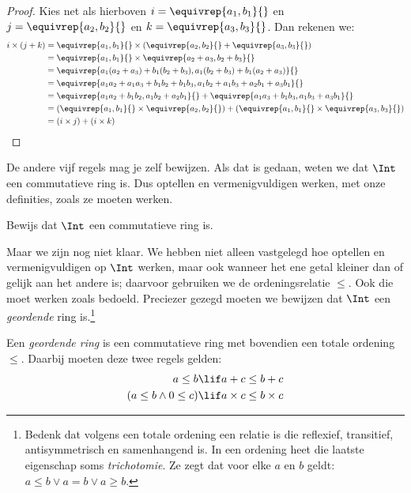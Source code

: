 \documentclass[openany]{memoir}
\begin{document}
\begin{proof}
Kies net als hierboven $i = \equivrep{a_1, b_1}{}$ en $j =
\equivrep{a_2,b_2}{}$ en $k = \equivrep{a_3, b_3}{}$. Dan rekenen we:
\begin{align*}
	i \times (j + k) 
	&= \equivrep{a_1, b_1}{} \times (\equivrep{a_2,b_2}{} + \equivrep{a_3, b_3}{})\\
	&= \equivrep{a_1, b_1}{} \times \equivrep{a_2 + a_3,b_2+b_3}{}\\
	&= \equivrep{a_1  (a_2 + a_3) + b_1  (b_2+b_3), a_1  (b_2 + b_3) + b_1 (a_2 + a_3)}{}\\
	&= \equivrep{a_1 a_2 + a_1a_3 + b_1 b_2+b_1b_3, a_1 b_2 + a_1b_3 + a_2b_1 + a_3b_1}{}\\		
	&= \equivrep{a_1a_2 + b_1b_2, a_1b_2 + a_2b_1}{} + \equivrep{a_1a_3 + b_1b_3, a_1b_3 + a_3b_1}{}\\
	&= (\equivrep{a_1, b_1}{} \times \equivrep{a_2,b_2}{}) + (\equivrep{a_1, b_1}{} \times  \equivrep{a_3, b_3}{})\\
	&= (i \times j) + (i \times k)
\end{align*}
\end{proof}
De andere vijf regels mag je zelf bewijzen. Als dat is gedaan, weten
we dat $\Int$ een commutatieve ring is. Dus optellen en
vermenigvuldigen werken, met onze definities, zoals ze moeten werken.
\begin{prob}
Bewijs dat $\Int$ een commutatieve ring is.
\end{prob}
Maar we zijn nog niet klaar. We hebben niet alleen vastgelegd hoe
optellen en vermenigvuldigen op $\Int$ werken, maar ook wanneer het
ene getal kleiner dan of gelijk aan het andere is; daarvoor gebruiken
we de ordeningsrelatie $\leq$. Ook die moet werken zoals bedoeld.
Preciezer gezegd moeten we bewijzen dat $\Int$ een \emph{geordende}
ring is.\footnote{Bedenk dat volgens
	 een totale ordening
	een relatie is die reflexief, transitief, antisymmetrisch en samenhangend is.
	In een ordening heet die laatste eigenschap soms
	\emph{trichotomie}. Ze zegt dat voor elke $a$ en $b$ geldt: $a \leq b \lor a
	= b \lor a \geq b$.} 
\begin{defn}
Een \emph{geordende ring} is een commutatieve ring met bovendien een
totale ordening $\leq$. Daarbij moeten deze twee regels gelden:
\begin{align*}
	a \leq b &\lif a + c \leq b + c\\
	(a \leq b \land 0 \leq c) &\lif a \times c \leq b \times c
\end{align*}
\end{defn}
\end{document}
